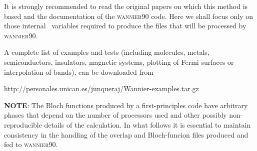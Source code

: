 It is strongly recommended to read the original papers on which this
method is based and the  documentation of the \textsc{wannier90} code.
Here we shall focus only on those internal \siesta\ variables
required to produce the files that will be processed
by \textsc{wannier90}.

A complete list of examples and tests (including molecules, metals, 
semiconductors, insulators, magnetic systems, plotting of Fermi surfaces
or interpolation of bands), can be downloaded from

 http://personales.unican.es/junqueraj/Wannier-examples.tar.gz

\textbf{NOTE}: The Bloch functions produced by a first-principles code
      have arbitrary phases that depend on the number of processors
      used and other possibly non-reproducible details of the
      calculation. In what follows it is essential to maintain
      consistency in the handling of the overlap and Bloch-funcion
      files produced and fed to \textsc{wannier90}.

